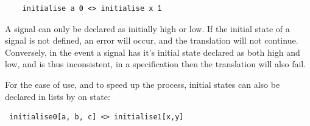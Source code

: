 \documentclass[british,conference,compsoc]{IEEEtran}
\begin{document}
\begin{verbatim}
    initialise a 0 <> initialise x 1
\end{verbatim}

\noindent A signal can only be declared as initially high or low. If the 
initial state of a signal is not defined, an error will occur, and the 
translation will not continue. Conversely, in the event a signal has it's 
initial state declared as both high and low, and is thus inconsistent, in a 
specification then the translation will also fail.

For the ease of use, and to speed up the process, initial states can also be 
declared in lists by on state:

\begin{verbatim}
 initialise0[a, b, c] <> initialise1[x,y]
\end{verbatim}

%
%

\vspace{-2mm}
\end{document}
